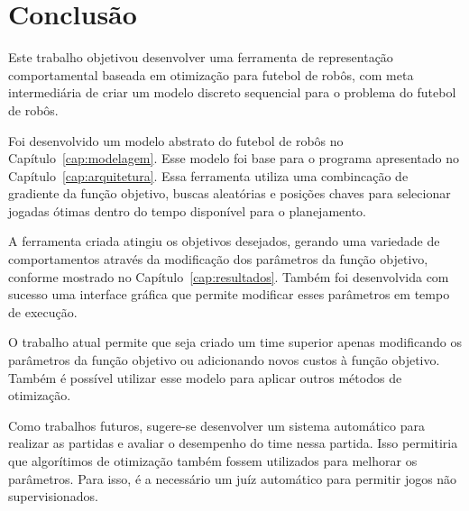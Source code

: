 \chapter{Conclusão}\label{cap:conclusao}


Este trabalho objetivou desenvolver uma ferramenta de representação
comportamental baseada em otimização para futebol de robôs, com meta
intermediária de criar um modelo discreto sequencial para o problema do futebol
de robôs.

Foi desenvolvido um modelo abstrato do futebol de robôs no
Capítulo~\ref{cap:modelagem}.  Esse modelo foi base para o programa apresentado
no Capítulo~\ref{cap:arquitetura}.  Essa ferramenta utiliza uma combincação de
gradiente da função objetivo, buscas aleatórias e posições chaves para
selecionar jogadas ótimas dentro do tempo disponível para o planejamento.

A ferramenta criada atingiu os objetivos desejados, gerando uma variedade de
comportamentos através da modificação dos parâmetros da função objetivo,
conforme mostrado no Capítulo~\ref{cap:resultados}.  Também foi desenvolvida com
sucesso uma interface gráfica que permite modificar esses parâmetros em tempo de
execução.

O trabalho atual permite que seja criado um time superior apenas modificando os
parâmetros da função objetivo ou adicionando novos custos à função objetivo.
Também é possível utilizar esse modelo para aplicar outros métodos de otimização.

Como trabalhos futuros, sugere-se desenvolver um sistema automático para
realizar as partidas e avaliar o desempenho do time nessa partida.  Isso
permitiria que algorítimos de otimização também fossem utilizados para
melhorar os parâmetros.  Para isso, é a necessário um juíz automático
para permitir jogos não supervisionados.

